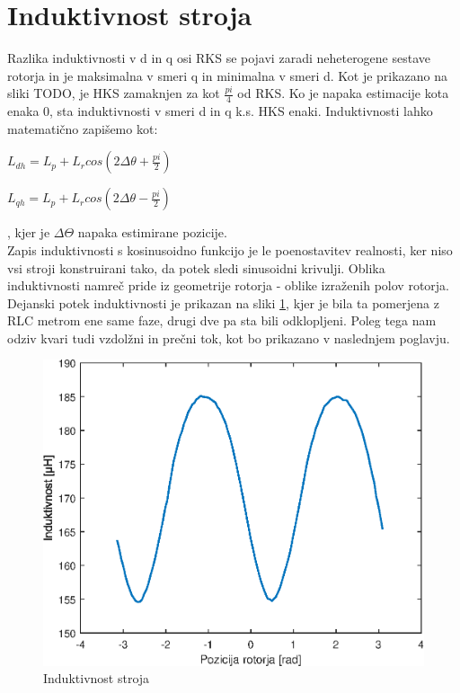 \documentclass[a4paper,twoside,openright,12pt,slovene]{book}
\begin{document}
\section{Induktivnost stroja}
Razlika induktivnosti v d in q osi RKS se pojavi zaradi neheterogene sestave rotorja in je maksimalna v smeri q in minimalna v smeri d. Kot je prikazano na sliki TODO, je
HKS zamaknjen za kot $\frac{pi}{4}$ od RKS. Ko je napaka estimacije kota enaka 0, sta induktivnosti v smeri d in q k.s. HKS enaki. Induktivnosti lahko matematično zapišemo kot:

\begin{center}
    $L_{dh} = L_p + L_r cos(2\Delta\theta + \frac{pi}{2})$

    $L_{qh} = L_p + L_r cos(2\Delta\theta - \frac{pi}{2})$
\end{center}

, kjer je $\Delta\Theta$ napaka estimirane pozicije.
\\
Zapis induktivnosti s kosinusoidno funkcijo je le poenostavitev realnosti, ker niso vsi stroji konstruirani tako, da potek sledi sinusoidni krivulji. Oblika induktivnosti namreč pride iz geometrije
rotorja - oblike izraženih polov rotorja. Dejanski potek induktivnosti je prikazan na sliki \ref{induktivnostStroja}, kjer je bila ta pomerjena z RLC metrom ene same faze, drugi dve pa sta bili
odklopljeni. Poleg tega nam odziv kvari tudi vzdolžni in prečni tok, kot bo prikazano v naslednjem poglavju.

\begin{figure}[!htbp]
    \centering
    \includegraphics[width=1\columnwidth]{Slike/induktivnostStroja.eps}
    \caption{\label{induktivnostStroja} Induktivnost stroja}
\end{figure}
\end{document}
